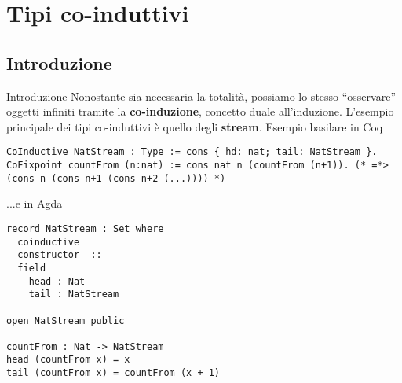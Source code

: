 \documentclass[t,aspectratio=169,9pt]{beamer}
\begin{document}
\section[coinduttivi]{Tipi co-induttivi}
\subsection{Introduzione}
\begin{frame}[fragile]{Introduzione}
	Nonostante sia necessaria la totalità, possiamo lo stesso ``osservare'' oggetti
	infiniti tramite la {\bf co-induzione}, concetto duale all'induzione. L'esempio
	principale dei tipi co-induttivi è quello degli {\bf stream}. Esempio basilare in
	Coq
	\begin{verbatim}
CoInductive NatStream : Type := cons { hd: nat; tail: NatStream }.
CoFixpoint countFrom (n:nat) := cons nat n (countFrom (n+1)). (* =*> (cons n (cons n+1 (cons n+2 (...)))) *)
\end{verbatim}
	...e in Agda
	\begin{verbatim}
record NatStream : Set where
  coinductive
  constructor _::_
  field
    head : Nat
    tail : NatStream

open NatStream public 

countFrom : Nat -> NatStream 
head (countFrom x) = x 
tail (countFrom x) = countFrom (x + 1)
\end{verbatim}
\end{frame}
\end{document}
